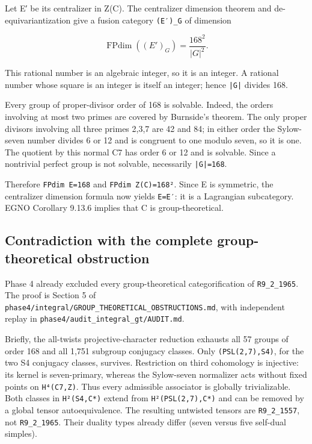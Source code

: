 Let E′ be its centralizer in Z(C). The centralizer dimension theorem and
de-equivariantization give a fusion category
\texttt{(E′)\_\allowbreak{}G} of dimension

\[
\operatorname{FPdim}((E')_G)=\frac{168^2}{|G|^2}.
\]

This rational number is an algebraic integer, so it is an integer. A
rational number whose square is an integer is itself an integer; hence
\texttt{|G|} divides 168.

Every group of proper-divisor order of 168 is solvable. Indeed, the
orders involving at most two primes are covered by Burnside's theorem.
The only proper divisors involving all three primes 2,3,7 are 42 and 84;
in either order the Sylow-seven number divides 6 or 12 and is congruent
to one modulo seven, so it is one. The quotient by this normal C7 has
order 6 or 12 and is solvable. Since a nontrivial perfect group is not
solvable, necessarily \texttt{|G|=16\allowbreak{}8}.

Therefore \texttt{FPdim \allowbreak{}E=168} and
\texttt{FPdim \allowbreak{}Z(C)=1\allowbreak{}68²}. Since E is
symmetric, the centralizer dimension formula now yields \texttt{E=E′}:
it is a Lagrangian subcategory. EGNO Corollary 9.13.6 implies that C is
group-theoretical.

\hypertarget{contradiction-with-the-complete-group-theoretical-obstruction}{%
\subsection{Contradiction with the complete group-theoretical
obstruction}\label{contradiction-with-the-complete-group-theoretical-obstruction}}

Phase 4 already excluded every group-theoretical categorification of
\texttt{R9\_\allowbreak{}2\_\allowbreak{}1965}. The proof is Section 5
of
\texttt{phase4\allowbreak{}/\allowbreak{}integr\allowbreak{}al/\allowbreak{}GROUP\_\allowbreak{}THEORE\allowbreak{}TICAL\_\allowbreak{}OBSTRU\allowbreak{}CTIONS\allowbreak{}.\allowbreak{}md},
with independent replay in
\texttt{phase4\allowbreak{}/\allowbreak{}audit\_\allowbreak{}integr\allowbreak{}al\_\allowbreak{}gt/\allowbreak{}AUDIT.\allowbreak{}md}.

Briefly, the all-twists projective-character reduction exhausts all 57
groups of order 168 and all 1,751 subgroup conjugacy classes. Only
\texttt{(PSL(2\allowbreak{},7),S4\allowbreak{})}, for the two S4
conjugacy classes, survives. Restriction on third cohomology is
injective: its kernel is seven-primary, whereas the Sylow-seven
normalizer acts without fixed points on \texttt{H⁴(C7,\allowbreak{}Z)}.
Thus every admissible associator is globally trivializable. Both classes
in \texttt{H²(S4,\allowbreak{}C*)} extend from
\texttt{H²(PSL\allowbreak{}(2,7),\allowbreak{}C*)} and can be removed by
a global tensor autoequivalence. The resulting untwisted tensors are
\texttt{R9\_\allowbreak{}2\_\allowbreak{}1557}, not
\texttt{R9\_\allowbreak{}2\_\allowbreak{}1965}. Their duality types
already differ (seven versus five self-dual simples).


